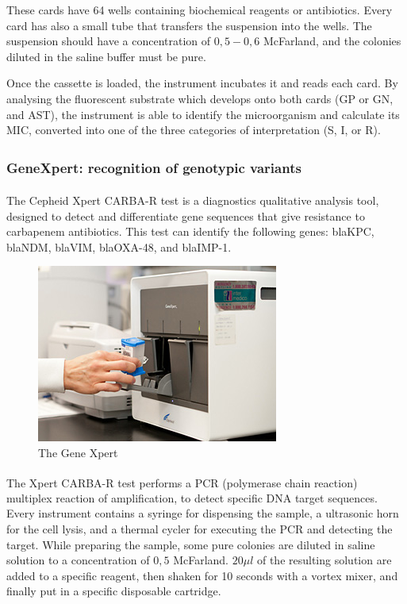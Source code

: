 \documentclass[11pt]{report}
\begin{document}
These cards have 64 wells containing biochemical reagents or antibiotics. Every card has also a small tube that transfers the suspension into the wells.
The suspension should have a concentration of $0,5-0,6$ McFarland, and the colonies diluted in the saline buffer must be pure.

Once the cassette is loaded, the instrument incubates it and reads each card.
By analysing the fluorescent substrate which develops onto both cards (GP or GN, and AST), the instrument is able to identify the microorganism and calculate its MIC, converted into one of the three categories of interpretation (S, I, or R).

\subsubsection{GeneXpert\textsuperscript{\textregistered}: recognition of genotypic variants}
The Cepheid Xpert\textsuperscript{\textregistered} CARBA-R test is a diagnostics qualitative analysis tool, designed to detect and differentiate gene sequences that give resistance to carbapenem antibiotics.
This test can identify the following genes: blaKPC, blaNDM, blaVIM, blaOXA-48, and blaIMP-1.

\begin{figure}[htp]
\centering
\includegraphics[scale=1.00]{img/genexpert.jpg}
\caption{The Gene Xpert}
\label{}
\end{figure}

The Xpert\textsuperscript{\textregistered} CARBA-R test performs a PCR (polymerase chain reaction) multiplex reaction of amplification, to detect specific DNA target sequences.
Every instrument contains a syringe for dispensing the sample, a ultrasonic horn for the cell lysis, and a thermal cycler for executing the PCR and detecting the target.
While preparing the sample, some pure colonies are diluted in saline solution to a concentration of $0,5$ McFarland. 
$20\mu l$ of the resulting solution are added to a specific reagent, then shaken for 10 seconds with a vortex mixer, and finally put in a specific disposable cartridge.
\end{document}

